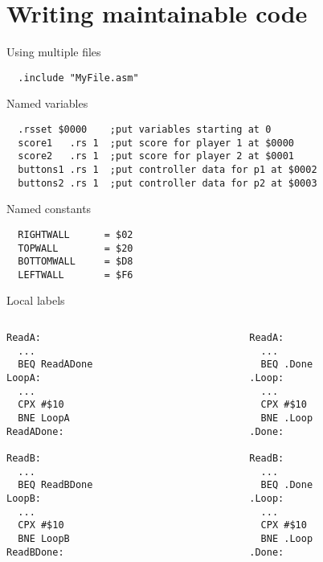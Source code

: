 \part{Writing maintainable code}
\frame{\partpage}

\begin{frame}[fragile]{Using multiple files}
	\begin{lstlisting}
  .include "MyFile.asm"
	\end{lstlisting}
\end{frame}

\begin{frame}[fragile]{Named variables}
\begin{lstlisting}
  .rsset $0000    ;put variables starting at 0								
  score1   .rs 1  ;put score for player 1 at $0000						
  score2   .rs 1  ;put score for player 2 at $0001						
  buttons1 .rs 1  ;put controller data for p1 at $0002	
  buttons2 .rs 1  ;put controller data for p2 at $0003	
\end{lstlisting}
\end{frame}

\begin{frame}[fragile]{Named constants}
\begin{lstlisting}
  RIGHTWALL      = $02	
  TOPWALL        = $20	
  BOTTOMWALL     = $D8	
  LEFTWALL       = $F6	
\end{lstlisting}
\end{frame}

\begin{frame}[fragile]{Local labels}
	\begin{columns}
		\begin{column}{0.4\textwidth}
\begin{lstlisting}
ReadA: 
  ...
  BEQ ReadADone   
LoopA:
  ...         
  CPX #$10			
  BNE LoopA       
ReadADone:        
  
ReadB: 
  ...
  BEQ ReadBDone   
LoopB:
  ...
  CPX #$10			
  BNE LoopB
ReadBDone:        
\end{lstlisting}
		\end{column}
		\begin{column}{0.1\textwidth}
			\pause{\large$$=$$}
		\end{column}
		\begin{column}{0.4\textwidth}
\begin{lstlisting}
ReadA: 
  ...
  BEQ .Done   
.Loop:
  ...         
  CPX #$10			
  BNE .Loop
.Done:

ReadB: 
  ...
  BEQ .Done   
.Loop:
  ...         
  CPX #$10			
  BNE .Loop
.Done:
\end{lstlisting}
		\end{column}
	\end{columns}
\end{frame}


